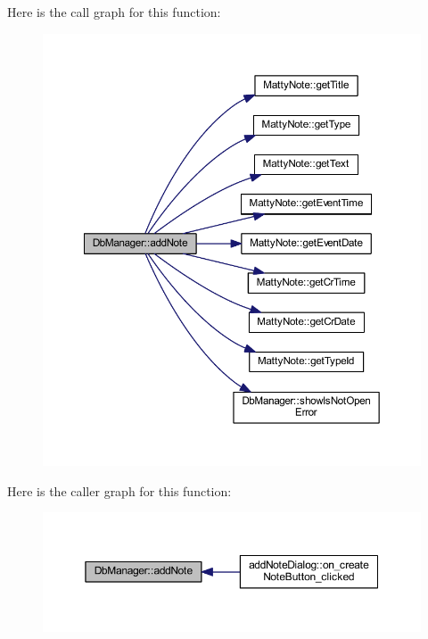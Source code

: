 Here is the call graph for this function\+:
\nopagebreak
\begin{figure}[H]
\begin{center}
\leavevmode
\includegraphics[width=350pt]{classDbManager_a0d97afdec08f212ec39100d26d8b4273_cgraph}
\end{center}
\end{figure}
Here is the caller graph for this function\+:
\nopagebreak
\begin{figure}[H]
\begin{center}
\leavevmode
\includegraphics[width=350pt]{classDbManager_a0d97afdec08f212ec39100d26d8b4273_icgraph}
\end{center}
\end{figure}
\hypertarget{classDbManager_abc90b3bf97dda268b4160a0662305898}{}\label{classDbManager_abc90b3bf97dda268b4160a0662305898} 
